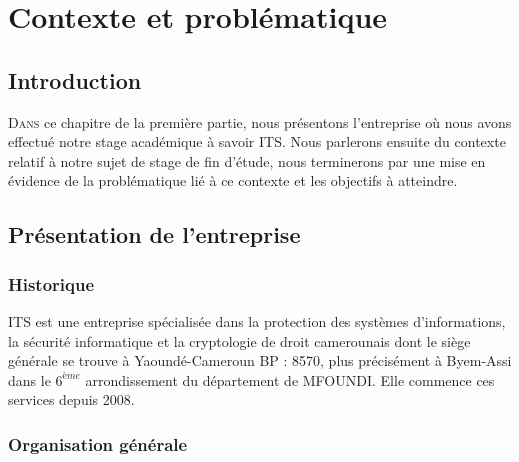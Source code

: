 \chapter{Contexte et problématique}

	\section*{Introduction}
	\lettrine{D}{ans} ce chapitre de la première partie, nous présentons l'entreprise où nous avons effectué notre stage académique à savoir ITS. Nous parlerons ensuite du contexte relatif à notre sujet de stage de fin d'étude, nous terminerons par une mise en évidence de la problématique lié à ce contexte  et les objectifs à atteindre. 
	

	\section{Présentation de l'entreprise}
		\subsection{Historique}
			ITS  est une entreprise spécialisée dans la protection des systèmes d'informations, la
sécurité informatique et la cryptologie de droit camerounais dont le siège générale se trouve à Yaoundé-Cameroun BP : 8570, plus précisément à Byem-Assi dans le $6^{ème}$ arrondissement du département de MFOUNDI. Elle commence ces services depuis 2008.
		
		\subsection{Organisation générale}
		
		
